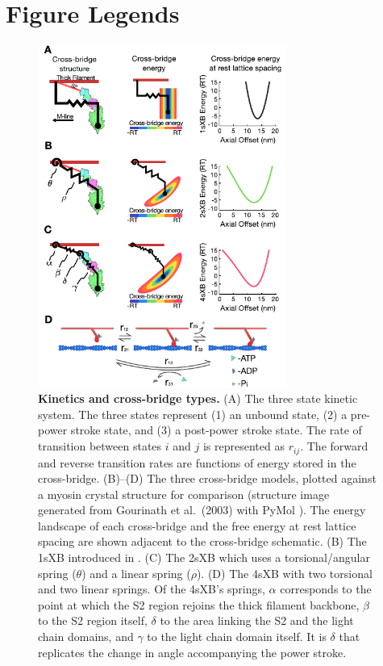\documentclass[10pt]{article}
\newcommand{\citep}[1]{\cite{#1}} %
\begin{document}
\section*{Figure Legends} %

\clearpage
\begin{figure}[ht]
    \begin{center}
    \includegraphics[width=3.2in]{../imgs/Figure1.pdf}
    \caption{ \textbf{Kinetics and cross-bridge types.} 
        (A)  The three state kinetic system. 
        The three states represent (1) an unbound state, (2) a pre-power stroke state, and (3) a post-power stroke state. 
        The rate of transition between states $i$ and $j$ is represented as $r_{ij}$. 
        The forward and reverse transition rates are functions of energy stored in the cross-bridge. 
        (B)--(D) The three cross-bridge models, plotted against a myosin crystal structure for comparison (structure image generated from Gourinath et al.~(2003) \protect\citep{Gourinath2003} with PyMol \protect\citep{pymol}).
        The energy landscape of each cross-bridge and the free energy at rest lattice spacing are shown adjacent to the cross-bridge schematic.
        (B) The 1sXB introduced in \protect\citep{Huxley1957}. 
        (C) The 2sXB which uses a torsional/angular spring ($\theta$) and a linear spring ($\rho$). 
        (D) The 4sXB with two torsional and two linear springs.
        Of the 4sXB's springs, $\alpha$ corresponds to the point at which the S2 region rejoins the thick filament backbone, $\beta$ to the S2 region itself, $\delta$ to the area linking the S2 and the light chain domains, and $\gamma$ to the light chain domain itself.
        It is $\delta$ that replicates the change in angle accompanying the power stroke.
        \label{fig_xb_types}
        }
    \end{center}
\end{figure}
\end{document}
